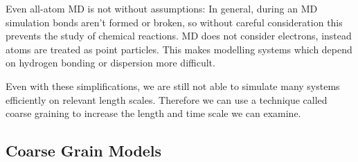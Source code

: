 Even all-atom MD is not without assumptions:
In general, during an MD simulation bonds aren't formed or broken, so without careful consideration this prevents the study of chemical reactions.
MD does not consider electrons, instead atoms are treated as point particles. 
This makes modelling systems which depend on hydrogen bonding or dispersion more difficult.

Even with these simplifications, we are still not able to simulate many systems efficiently on relevant length scales.
Therefore we can use a technique called coarse graining to increase the length and time scale we can examine.

\subsection*{Coarse Grain Models}

